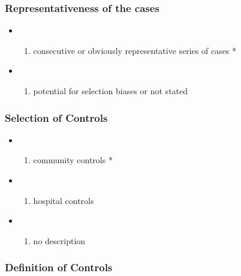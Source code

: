 \documentclass[
  doc, a4paper]{apa7}
\providecommand{\tightlist}{%
  \setlength{\itemsep}{0pt}\setlength{\parskip}{0pt}}
\begin{document}
\subsubsection{Representativeness of the cases}\label{representativeness-of-the-cases}

\begin{itemize}
\tightlist
\item
  \begin{enumerate}
  \def\labelenumi{\alph{enumi})}
  \tightlist
  \item
    consecutive or obviously representative series of cases *
  \end{enumerate}
\item
  \begin{enumerate}
  \def\labelenumi{\alph{enumi})}
  \setcounter{enumi}{1}
  \tightlist
  \item
    potential for selection biases or not stated
  \end{enumerate}
\end{itemize}

\subsubsection{Selection of Controls}\label{selection-of-controls}

\begin{itemize}
\tightlist
\item
  \begin{enumerate}
  \def\labelenumi{\alph{enumi})}
  \tightlist
  \item
    community controls *
  \end{enumerate}
\item
  \begin{enumerate}
  \def\labelenumi{\alph{enumi})}
  \setcounter{enumi}{1}
  \tightlist
  \item
    hospital controls
  \end{enumerate}
\item
  \begin{enumerate}
  \def\labelenumi{\alph{enumi})}
  \setcounter{enumi}{2}
  \tightlist
  \item
    no description
  \end{enumerate}
\end{itemize}

\subsubsection{Definition of Controls}\label{definition-of-controls}
\end{document}

